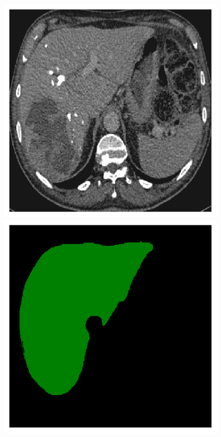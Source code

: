 {\begin{figure}[!ht]
\begin{mdframed}[backgroundcolor=blue!50,linecolor=blue!50]
\begin{minipage}{4cm}
		\includegraphics[width=\linewidth]{images/LiverVE_Raw_Pat0_3}
	\end{minipage} \hspace{-0.3cm}
	\begin{minipage}{4cm}
		\includegraphics[width=\linewidth]{images/LiverVE_GT_Pat0_3}

\end{minipage}
\end{mdframed}
\end{figure}}
